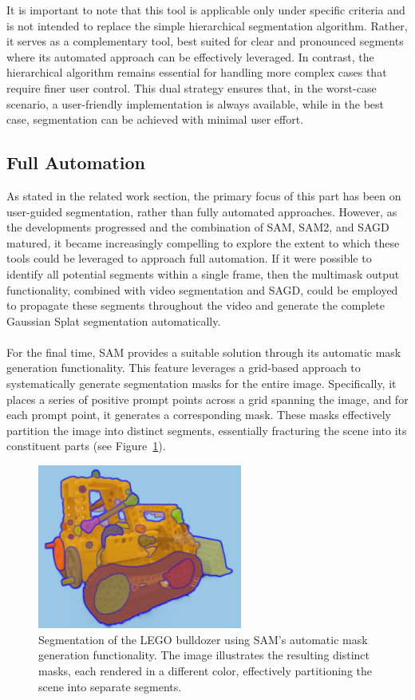 \documentclass[12pt]{article}
\begin{document}
\FloatBarrier
\noindent
It is important to note that this tool is applicable only under specific criteria and is not intended to replace the simple hierarchical segmentation algorithm. Rather, it serves as a complementary tool, best suited for clear and pronounced segments where its automated approach can be effectively leveraged. In contrast, the hierarchical algorithm remains essential for handling more complex cases that require finer user control. This dual strategy ensures that, in the worst-case scenario, a user-friendly implementation is always available, while in the best case, segmentation can be achieved with minimal user effort.
\subsection{Full Automation}
As stated in the related work section, the primary focus of this part has been on user-guided segmentation, rather than fully automated approaches. However, as the developments progressed and the combination of SAM, SAM2, and SAGD matured, it became increasingly compelling to explore the extent to which these tools could be leveraged to approach full automation. If it were possible to identify all potential segments within a single frame, then the multimask output functionality, combined with video segmentation and SAGD, could be employed to propagate these segments throughout the video and generate the complete Gaussian Splat segmentation automatically.
\\\\
For the final time, SAM provides a suitable solution through its automatic mask generation functionality. This feature leverages a grid-based approach to systematically generate segmentation masks for the entire image. Specifically, it places a series of positive prompt points across a grid spanning the image, and for each prompt point, it generates a corresponding mask. These masks effectively partition the image into distinct segments, essentially fracturing the scene into its constituent parts (see Figure~\ref{fig:everything}).
\begin{figure}[h!]
	\centering
	\includegraphics[width=0.6\textwidth]{Images/everything.png}
	\caption{Segmentation of the LEGO bulldozer using SAM’s automatic mask generation functionality. The image illustrates the resulting distinct masks, each rendered in a different color, effectively partitioning the scene into separate segments.
	}
	\label{fig:everything}
\end{figure}
\end{document}
